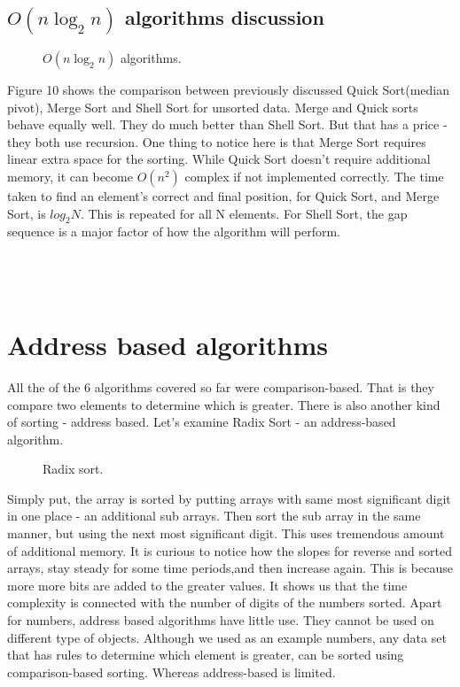\documentclass{acm_proc_article-sp}
\begin{document}
\subsection{$O(n \log_2 n)$ algorithms discussion}
\begin{figure}[!htb]
\caption{$O(n \log_2 n)$ algorithms.}
\end{figure}
Figure 10 shows the comparison between previously discussed Quick Sort(median pivot), Merge Sort and Shell Sort for unsorted data. Merge and Quick sorts behave equally well. They do much better than Shell Sort. But that has a price - they both use recursion.  One thing to notice here is that Merge Sort requires linear extra space for the sorting. While Quick Sort doesn't require additional memory, it can become $O(n^2)$ complex if not implemented correctly. The time taken to find an element's correct and final position, for Quick Sort, and Merge Sort, is $log_2 N$. This is repeated for all N elements. For Shell Sort, the gap sequence is a major factor of how the algorithm will perform.\\\\\\\\
 
\section{Address based algorithms}
All the of the 6 algorithms covered so far were comparison-based. That is they compare two elements to determine which is greater. There is also another kind of sorting - address based. Let's examine Radix Sort - an address-based algorithm.\begin{figure}[!htb]
\caption{Radix sort.}
\end{figure}
Simply put, the array is sorted by putting arrays with same most significant digit in one place - an additional sub arrays. Then sort the sub array in the same manner, but using the next most significant digit. This uses tremendous amount of additional memory.  It is curious to notice how the slopes for reverse and sorted arrays, stay steady for some time periods,and then increase again. This is because more more bits are added to the greater values. It shows us that the time complexity is connected with the number of digits of the numbers sorted. Apart for numbers, address based algorithms have little use. They cannot be used on different type of objects. Although we used as an example numbers, any data set that has rules to determine which element is greater, can be sorted using comparison-based sorting. Whereas address-based is limited.\\
\end{document}
